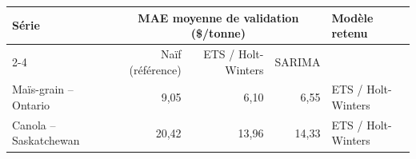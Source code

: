 \begin{tabular}{lrrrl}
\toprule
Série & \multicolumn{3}{c}{MAE moyenne de validation (\$/tonne)} & Modèle retenu \\
\cmidrule(lr){2-4}
& Naïf (référence) & ETS / Holt-Winters & SARIMA & \\
\midrule
Maïs-grain -- Ontario & 9,05 & 6,10 & 6,55 & ETS / Holt-Winters \\
Canola -- Saskatchewan & 20,42 & 13,96 & 14,33 & ETS / Holt-Winters \\
\bottomrule
\end{tabular}
